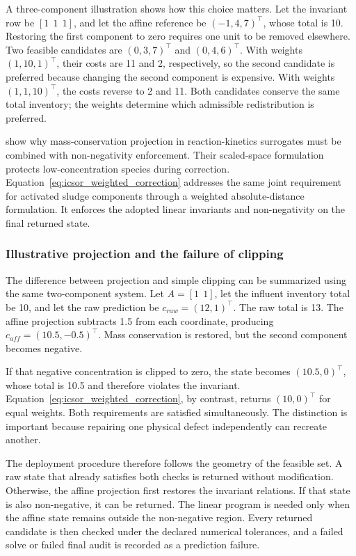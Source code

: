 A three-component illustration shows how this choice matters. Let the invariant row be \([1\ \ 1\ \ 1]\), and let the affine reference be \((-1,4,7)^\top\), whose total is 10. Restoring the first component to zero requires one unit to be removed elsewhere. Two feasible candidates are \((0,3,7)^\top\) and \((0,4,6)^\top\). With weights \((1,10,1)^\top\), their costs are 11 and 2, respectively, so the second candidate is preferred because changing the second component is expensive. With weights \((1,1,10)^\top\), the costs reverse to 2 and 11. Both candidates conserve the same total inventory; the weights determine which admissible redistribution is preferred.

\citet{KircherVotsmeier2025} show why mass-conservation projection in reaction-kinetics surrogates must be combined with non-negativity enforcement. Their scaled-space formulation protects low-concentration species during correction. Equation~\eqref{eq:icsor_weighted_correction} addresses the same joint requirement for activated sludge components through a weighted absolute-distance formulation. It enforces the adopted linear invariants and non-negativity on the final returned state.

\subsubsection{Illustrative projection and the failure of clipping}

The difference between projection and simple clipping can be summarized using the same two-component system. Let \(A=[1\ \ 1]\), let the influent inventory total be 10, and let the raw prediction be \(c_{raw}=(12,1)^\top\). The raw total is 13. The affine projection subtracts 1.5 from each coordinate, producing \(c_{aff}=(10.5,-0.5)^\top\). Mass conservation is restored, but the second component becomes negative.

If that negative concentration is clipped to zero, the state becomes \((10.5,0)^\top\), whose total is 10.5 and therefore violates the invariant. Equation~\eqref{eq:icsor_weighted_correction}, by contrast, returns \((10,0)^\top\) for equal weights. Both requirements are satisfied simultaneously. The distinction is important because repairing one physical defect independently can recreate another.

The deployment procedure therefore follows the geometry of the feasible set. A raw state that already satisfies both checks is returned without modification. Otherwise, the affine projection first restores the invariant relations. If that state is also non-negative, it can be returned. The linear program is needed only when the affine state remains outside the non-negative region. Every returned candidate is then checked under the declared numerical tolerances, and a failed solve or failed final audit is recorded as a prediction failure.

